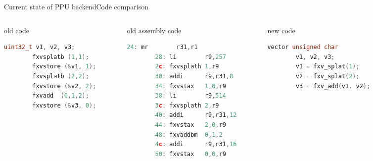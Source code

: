 \documentclass[10pt]{beamer}
\begin{document}
\begin{frame}[fragile]{Current state of PPU backend}{Code comparison}
\begin{columns}[t]
	\begin{column}{0.3\textwidth}
      \begin{block}{old code}
      \begin{lstlisting}[language=C++,basicstyle=\ttfamily\scriptsize,keywordstyle=\color{red}]
		uint32_t v1, v2, v3;
		fxvsplatb (1,1);
		fxvstore (&v1, 1);
		fxvsplatb (2,2);
		fxvstore (&v2, 2);
		fxvadd 	(0,1,2);
		fxvstore (&v3, 0);
		\end{lstlisting}
      \end{block}
    \end{column}    
    \begin{column}{0.3\textwidth}
      \begin{block}{old assembly code}
        \begin{lstlisting}[language=C++,basicstyle=\ttfamily\scriptsize,keywordstyle=\color{red}]
		24: mr        r31,r1
		28: li        r9,257
		2c: fxvsplath 1,r9
		30: addi      r9,r31,8
		34: fxvstax   1,0,r9
		38: li        r9,514
		3c: fxvsplath 2,r9
		40: addi      r9,r31,12
		44: fxvstax   2,0,r9
		48: fxvaddbm  0,1,2
		4c: addi      r9,r31,16
		50: fxvstax   0,0,r9

	\end{lstlisting}
      \end{block}
    \end{column}
    \begin{column}{0.3\textwidth}
      \begin{block}{new code}
        \begin{lstlisting}[language=C++,basicstyle=\ttfamily\scriptsize,keywordstyle=\color{red}]
		vector unsigned char
		v1, v2, v3;
		v1 = fxv_splat(1);
		v2 = fxv_splat(2);	
		v3 = fxv_add(v1. v2);			
	\end{lstlisting}
      \end{block}
    \end{column}
\end{columns}
\end{frame}
\end{document}
